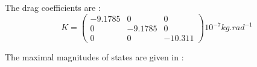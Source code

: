 \documentclass[anonymous=true,format=sigconf, screen=true, review=false]{acmart}
\begin{document}


The drag coefficients are \cite{nanoquadcop}:
\begin{equation*}
K =
\begin{pmatrix}
-9.1785 & 0 & 0 \\
0 & -9.1785 & 0 \\
0 & 0 & -10.311
\end{pmatrix}
10^{-7} kg.rad^{-1}
\end{equation*}

The maximal magnitudes of states are given in :


\end{document}
